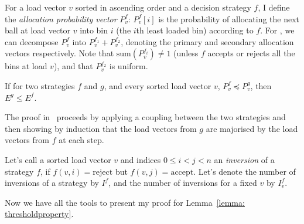 \begin{definition} 
For a load vector $v$ sorted in ascending order and a decision strategy $f$, I define the \textit{allocation probability vector} $P^f_v$: $P^f_v[i]$ is the probability of allocating the next ball at load vector $v$ into bin $i$ (the $i$th least loaded bin) according to $f$. For \TwoThinning, we can decompose $P^f_v$ into $P^{f_1}_{v}+P^{f_2}_{v}$, denoting the primary and secondary allocation vectors respectively. Note that $\mathrm{sum}(P^{f_i}_{v})\neq 1$ (unless $f$ accepts or rejects all the bins at load $v$), and that $P^{f_2}_{v}$ is uniform.
\end{definition}


\begin{lemma}  \label{lemma: majorisation-implies-better}
If for two strategies $f$ and $g$, and every sorted load vector $v$, $P^f_v\preccurlyeq P^g_v$, then $E^g\leq E^f$.
\end{lemma}

\begin{remark}
The proof in~\cite{azar1999twochoice} proceeds by applying a coupling between the two strategies and then showing by induction that the load vectors from $g$ are majorised by the load vectors from $f$ at each step.
\end{remark}


\begin{definition} 
Let's call a sorted load vector $v$ and indices $0\leq i<j<n$ an \textit{inversion} of a strategy $f$, if $f(v,i)=\mathrm{reject}$ but $f(v,j)=\mathrm{accept}$. Let's denote the number of inversions of a strategy by $I^f$, and the number of inversions for a fixed $v$ by $I^f_v$.
\end{definition}


Now we have all the tools to present my proof for Lemma~\ref{lemma: thresholdproperty}.

